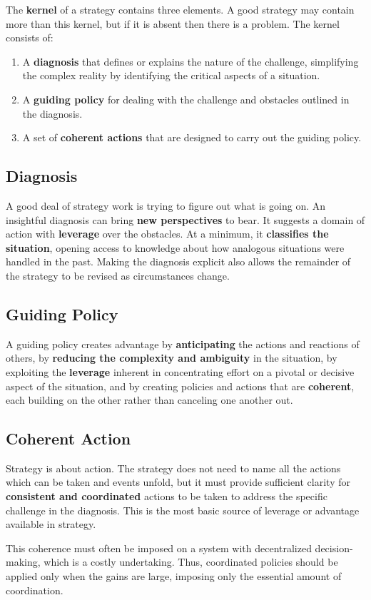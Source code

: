 \documentclass{article}
\newenvironment{nosepenumerate}
{ \begin{enumerate}
    \setlength{\itemsep}{0pt}
    \setlength{\parskip}{0pt}
    \setlength{\parsep}{0pt}     }
{ \end{enumerate}                  }
\begin{document}
\begin{multicols}{2}

\noindent
The \textbf{kernel} of a strategy contains three elements. A good strategy may contain more than this kernel, but if it is absent then there is a problem. The kernel consists of:

\begin{nosepenumerate}
    \item A \textbf{diagnosis} that defines or explains the nature of the challenge, simplifying the complex reality by identifying the critical aspects of a situation.
    \item A \textbf{guiding policy} for dealing with the challenge and obstacles outlined in the diagnosis. 
    \item A set of \textbf{coherent actions} that are designed to carry out the guiding policy.
\end{nosepenumerate}

\subsection{Diagnosis}

A good deal of strategy work is trying to figure out what is going on. An insightful diagnosis can bring \textbf{new perspectives} to bear. It suggests a domain of action with \textbf{leverage} over the obstacles. At a minimum, it \textbf{classifies the situation}, opening access to knowledge about how analogous situations were handled in the past. Making the diagnosis explicit also allows the remainder of the strategy to be revised as circumstances change.

\subsection{Guiding Policy}

A guiding policy creates advantage by \textbf{anticipating} the actions and reactions of others, by \textbf{reducing the complexity and ambiguity} in the situation, by exploiting the \textbf{leverage} inherent in concentrating effort on a pivotal or decisive aspect of the situation, and by creating policies and actions that are \textbf{coherent}, each building on the other rather than canceling one another out.

\subsection{Coherent Action}

Strategy is about action. The strategy does not need to name all the actions which can be taken and events unfold, but it must provide sufficient clarity for \textbf{consistent and coordinated} actions to be taken to address the specific challenge in the diagnosis. This is the most basic source of leverage or advantage available in strategy.

This coherence must often be imposed on a system with decentralized decision-making, which is a costly undertaking. Thus, coordinated policies should be applied only when the gains are large, imposing only the essential amount of coordination.

\end{multicols}
\end{document}

